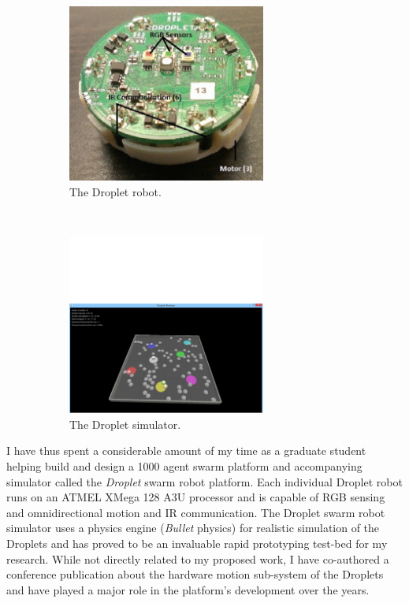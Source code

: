 \documentclass[11pt, onecolumn, compsoc, letterpaper]{article}
\begin{document}
\begin{figure}[!ht]
\begin{subfigure}{.5\textwidth}
\centering\includegraphics[width=6.5cm]{../assets/droplettop.jpg}
\centering\caption{The Droplet robot.}\label{fig:dropletrbt}
\end{subfigure}~
\begin{subfigure}{.5\textwidth}
\centering\includegraphics[width=6.5cm]{../assets/dsim.png}
\centering\caption{The Droplet simulator.}\label{fig:dropletsim}
\end{subfigure}
\caption{}
\end{figure}

I have thus spent a considerable amount of my time as a graduate student helping build and design a 1000 agent swarm platform and accompanying simulator called the \emph{Droplet} swarm robot platform. Each individual Droplet robot runs on an ATMEL XMega 128 A3U processor and is capable of RGB sensing and omnidirectional motion and IR communication. The Droplet swarm robot simulator uses a physics engine (\emph{Bullet} physics) for realistic simulation of the Droplets and has proved to be an invaluable rapid prototyping test-bed for my research. While not directly related to my proposed work, I have co-authored a conference publication  about the hardware motion sub-system of the Droplets \cite{Klingner2014} and have played a major role in the platform's development over the years.
\end{document}
